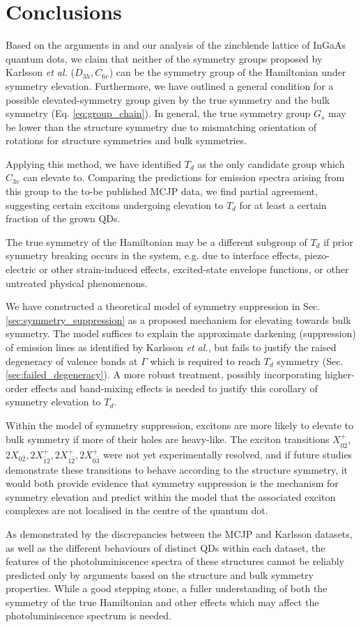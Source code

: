 \section{Conclusions} \label{sec:conclusions}

Based on the arguments in \cite{bulk_limiting} and our analysis of the zincblende lattice of InGaAs quantum dots, we claim that neither of the symmetry groups proposed by Karlsson \textit{et al.} ($D_{3h}, C_{6v}$) can be the symmetry group of the Hamiltonian under symmetry elevation. Furthermore, we have outlined a general condition for a possible elevated-symmetry group given by the true symmetry and the bulk symmetry (Eq. \ref{eq:group_chain}). In general, the true symmetry group $G_s$ may be lower than the structure symmetry due to mismatching orientation of rotations for structure symmetries and bulk symmetries.

Applying this method, we have identified $T_d$ as the only candidate group which $C_{3v}$ can elevate to. Comparing the predictions for emission spectra arising from this group to the to-be published MCJP data, we find partial agreement, suggesting certain excitons undergoing elevation to $T_d$ for at least a certain fraction of the grown QDs.

The true symmetry of the Hamiltonian may be a different subgroup of $T_d$ if prior symmetry breaking occurs in the system, e.g. due to interface effects, piezo-electric or other strain-induced effects, excited-state envelope functions, or other untreated physical phenomenons. 

We have constructed a theoretical model of symmetry suppression in Sec. \ref{sec:symmetry_suppression} as a proposed mechanism for elevating towards bulk symmetry. The model suffices to explain the approximate darkening (suppression) of emission lines as identified by Karlsson \textit{et al.}, but fails to justify the raised degeneracy of valence bands at $\Gamma$ which is required to reach $T_d$ symmetry (Sec. \ref{sec:failed_degeneracy}). A more robust treatment, possibly incorporating higher-order effects and band-mixing effects is needed to justify this corollary of symmetry elevation to $T_d$.

Within the model of symmetry suppression, excitons are more likely to elevate to bulk symmetry if more of their holes are heavy-like. The exciton transitions $X^+_{0\bar{2}}$, $2X_{0\bar{2}}, 2X^+_{\bar{1}2}, 2X^+_{1\bar{2}}, 2X^+_{0\bar{3}}$ were not yet experimentally resolved, and if future studies demonstrate these transitions to behave according to the structure symmetry, it would both provide evidence that symmetry suppression is the mechanism for symmetry elevation and predict within the model that the associated exciton complexes are not localised in the centre of the quantum dot.

As demonstrated by the discrepancies between the MCJP and Karlsson datasets, as well as the different behaviours of distinct QDs within each dataset, the features of the photoluminiscence spectra of these structures cannot be reliably predicted only by arguments based on the structure and bulk symmetry properties. While a good stepping stone, a fuller understanding of both the symmetry of the true Hamiltonian and other effects which may affect the photoluminiscence spectrum is needed.
